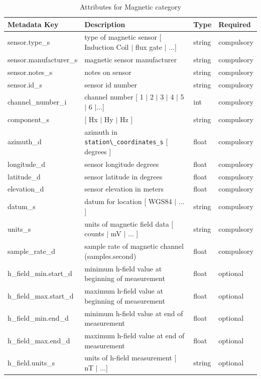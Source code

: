 \documentclass{article}
\begin{document}
\begin{table}[htb!]
	\caption[Attributes for Magnetic Channel]{Attributes for Magnetic category}
	\begin{tabular}{|l|p{3in}|l|l|}
		\hline
		\textbf{Metadata Key} & \textbf{Description} & \textbf{Type} & \textbf{Required} \\ \hline
		sensor.type\_s & type of magnetic sensor [ Induction Coil $|$ flux gate $|$ ...] & string & compulsory \\ \hline
		sensor.manufacturer\_s & magnetic sensor manufacturer & string &  compulsory \\ \hline
		sensor.notes\_s & notes on sensor & string & compulsory \\ \hline
		sensor.id\_s & sensor id number & string &  compulsory \\ \hline
		channel\_number\_i & channel number [ 1 $|$ 2 $|$ 3 $|$ 4 $|$ 5 $|$ 6 $|$...] & int &  compulsory \\ \hline
		component\_s & [ Hx $|$ Hy $|$ Hz ] & string  &  compulsory \\ \hline
		azimuth\_d & azimuth in \verb|station\_coordinates_s| [ degrees ]& float & compulsory \\ \hline
		longitude\_d & sensor longitude degrees & float & compulsory \\ \hline
		latitude\_d & sensor latitude in degrees & float &  compulsory \\ \hline
		elevation\_d & sensor elevation in meters & float &  compulsory \\ \hline
		datum\_s & datum for location [ WGS84 $|$ ... ] & string &  compulsory\\ \hline
		units\_s & units of magnetic field data [ counts $|$ mV $|$ ... ] & string &  compulsory \\ \hline
		sample\_rate\_d & sample rate of magnetic channel (samples.second) & float &  compulsory \\ \hline
		h\_field\_min.start\_d & minimum h-field value at beginning of measurement & float &  optional \\ \hline
		h\_field\_max.start\_d & maximum h-field value at beginning of measurement & float &  optional\\ \hline
		h\_field\_min.end\_d & minimum h-field value at end of measurement & float &  optional\\ \hline
		h\_field\_max.end\_d & maximum h-field value at end of measurement & float &  optional\\ \hline
		h\_field.units\_s & units of h-field measurement [ nT $|$ ...] & string &   optional \\ \hline

\end{tabular}
\end{table}
\end{document}
